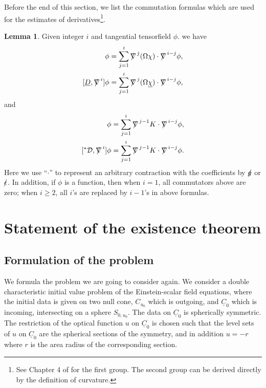 \documentclass[11pt,reqno]{amsart}
\theoremstyle{definition}
\newtheorem{lemma}{Lemma}[section]
\numberwithin{equation}{section}
\def\chib{\underline{\chi}}
\def\Cb{\underline{C}}
\newcommand{\Db}{\underline{D}}
\def\nablas{\mbox{$\nabla \mkern -13mu /$ }}
\def\gs{\mbox{$g \mkern -9mu /$}}
\def\epsilons{\mbox{$\epsilon \mkern -9mu /$}}
\begin{document}
Before the end of this section, we list the commutation formulas which are used for the estimates of derivatives\footnote{See Chapter 4 of \cite{Chr} for the first group. The second group can be derived directly by the definition of curvature.}.
\begin{lemma}\label{commutator}
Given integer $i$ and tangential tensorfield $\phi$. we have
\begin{align*}
[D,\nablas^i]\phi&=\sum_{j=1}^i\nablas^j(\Omega\chi)\cdot\nablas^{i-j}\phi,\\
[\Db,\nablas^i]\phi&=\sum_{j=1}^i\nablas^j(\Omega\chib)\cdot\nablas^{i-j}\phi,
\end{align*}
and
\begin{align*}
[\mathcal{D},\nablas^i]\phi&=\sum_{j=1}^i\nablas^{j-1}K\cdot\nablas^{i-j}\phi,\\
[^*\mathcal{D},\nablas^i]\phi&=\sum_{j=1}^i\nablas^{j-1}K\cdot\nablas^{i-j}\phi.
\end{align*}
Here we use ``$\cdot$'' to represent an arbitrary contraction with the coefficients by $\gs$ or $\epsilons$. In addition, if $\phi$ is a function, then when $i=1$, all commutators above are zero; when $i\ge2$, all $i$'s are replaced by $i-1$'s in above formulas.
\end{lemma}




\section{Statement of the existence theorem}\label{statementexistencetheorem}


\subsection{Formulation of the problem} We formula the problem we are going to consider again. We consider a double characteristic initial value problem of the Einstein-scalar field equations, where the initial data is given on two null cone, $C_{u_0}$ which is outgoing, and $\Cb_0$ which is incoming, intersecting on a sphere $S_{0,u_0}$. The data on $\Cb_0$ is spherically symmetric. The restriction of the optical function $u$ on $\Cb_0$ is chosen such that the level sets of $u$ on $\Cb_0$ are the spherical sections of the symmetry, and in addition $u=-r$ where $r$ is the area radius of the corresponding section.
\end{document}
